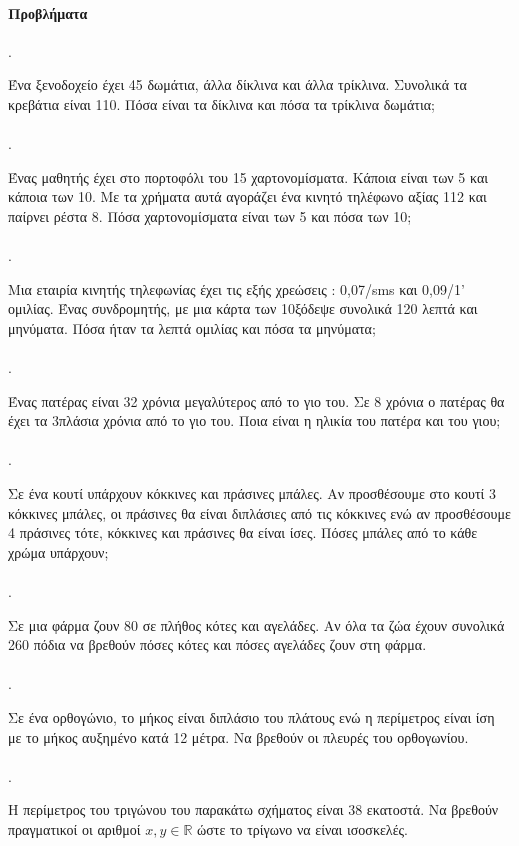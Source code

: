 \documentclass[11pt,a4paper,twocolumn]{article}
\newcounter{askhsh}
\newcommand{\askhsh}{\large\theaskhsh.\ \addtocounter{askhsh}{1}}
\begin{document}
\paragraph{Προβλήματα}
\askhsh Ένα ξενοδοχείο έχει 45 δωμάτια, άλλα δίκλινα και άλλα τρίκλινα. Συνολικά τα κρεβάτια είναι 110. Πόσα είναι τα δίκλινα και πόσα τα τρίκλινα δωμάτια;\\\\
\askhsh Ένας μαθητής έχει στο πορτοφόλι του 15 χαρτονομίσματα. Κάποια είναι των 5\officialeuro\; και κάποια των 10\officialeuro. Με τα χρήματα αυτά αγοράζει ένα κινητό τηλέφωνο αξίας 112\officialeuro\; και παίρνει ρέστα 8\officialeuro. Πόσα χαρτονομίσματα είναι των 5\officialeuro\; και πόσα των 10\officialeuro;\\\\
\askhsh Μια εταιρία κινητής τηλεφωνίας έχει τις εξής χρεώσεις : 0{,}07\officialeuro/sms και 0{,}09\officialeuro/1' ομιλίας. Ένας συνδρομητής, με μια κάρτα των 10\officialeuro\;ξόδεψε συνολικά 120 λεπτά και μηνύματα. Πόσα ήταν τα λεπτά ομιλίας και πόσα τα μηνύματα;\\\\
\askhsh Ένας πατέρας είναι 32 χρόνια μεγαλύτερος από το γιο του. Σε 8 χρόνια ο πατέρας θα έχει τα 3πλάσια χρόνια από το γιο του. Ποια είναι η ηλικία του πατέρα και του γιου;\\\\
\askhsh Σε ένα κουτί υπάρχουν κόκκινες και πράσινες μπάλες. Αν προσθέσουμε στο κουτί 3 κόκκινες μπάλες, οι πράσινες θα είναι διπλάσιες από τις κόκκινες ενώ αν προσθέσουμε 4 πράσινες τότε, κόκκινες και πράσινες θα είναι ίσες. Πόσες μπάλες από το κάθε χρώμα υπάρχουν;\\\\
\askhsh Σε μια φάρμα ζουν 80 σε πλήθος κότες και αγελάδες. Αν όλα τα ζώα έχουν συνολικά 260 πόδια να βρεθούν πόσες κότες και πόσες αγελάδες ζουν στη φάρμα.\\\\
\askhsh Σε ένα ορθογώνιο, το μήκος είναι διπλάσιο του πλάτους ενώ η περίμετρος είναι ίση με το μήκος αυξημένο κατά 12 μέτρα. Να βρεθούν οι πλευρές του ορθογωνίου.\\\\
\askhsh Η περίμετρος του τριγώνου του παρακάτω σχήματος είναι $ 38 $ εκατοστά. Να βρεθούν πραγματικοί οι αριθμοί $ x, y\in\mathbb{R} $ ώστε το τρίγωνο να είναι ισοσκελές.
\vspace{-5mm}
\begin{center}
\end{center}
\end{document}
